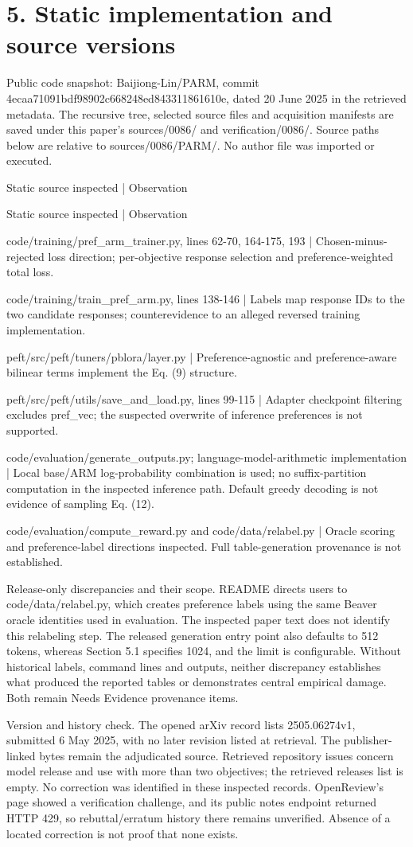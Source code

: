 \documentclass[10pt]{article}
\begin{document}
\section*{5. Static implementation and source versions}
Public code snapshot: Baijiong-Lin/PARM, commit 4ecaa71091bdf98902c668248ed843311861610e, dated 20 June 2025 in the retrieved metadata. The recursive tree, selected source files and acquisition manifests are saved under this paper’s sources/0086/ and verification/0086/. Source paths below are relative to sources/0086/PARM/. No author file was imported or executed.\par
Static source inspected | Observation\par
Static source inspected | Observation\par
code/training/pref\_arm\_trainer.py, lines 62-70, 164-175, 193 | Chosen-minus-rejected loss direction; per-objective response selection and preference-weighted total loss.\par
code/training/train\_pref\_arm.py, lines 138-146 | Labels map response IDs to the two candidate responses; counterevidence to an alleged reversed training implementation.\par
peft/src/peft/tuners/pblora/layer.py | Preference-agnostic and preference-aware bilinear terms implement the Eq. (9) structure.\par
peft/src/peft/utils/save\_and\_load.py, lines 99-115 | Adapter checkpoint filtering excludes pref\_vec; the suspected overwrite of inference preferences is not supported.\par
code/evaluation/generate\_outputs.py; language-model-arithmetic implementation | Local base/ARM log-probability combination is used; no suffix-partition computation in the inspected inference path. Default greedy decoding is not evidence of sampling Eq. (12).\par
code/evaluation/compute\_reward.py and code/data/relabel.py | Oracle scoring and preference-label directions inspected. Full table-generation provenance is not established.\par
Release-only discrepancies and their scope. README directs users to code/data/relabel.py, which creates preference labels using the same Beaver oracle identities used in evaluation. The inspected paper text does not identify this relabeling step. The released generation entry point also defaults to 512 tokens, whereas Section 5.1 specifies 1024, and the limit is configurable. Without historical labels, command lines and outputs, neither discrepancy establishes what produced the reported tables or demonstrates central empirical damage. Both remain Needs Evidence provenance items.\par
Version and history check. The opened arXiv record lists 2505.06274v1, submitted 6 May 2025, with no later revision listed at retrieval. The publisher-linked bytes remain the adjudicated source. Retrieved repository issues concern model release and use with more than two objectives; the retrieved releases list is empty. No correction was identified in these inspected records. OpenReview’s page showed a verification challenge, and its public notes endpoint returned HTTP 429, so rebuttal/erratum history there remains unverified. Absence of a located correction is not proof that none exists.\par
\end{document}
